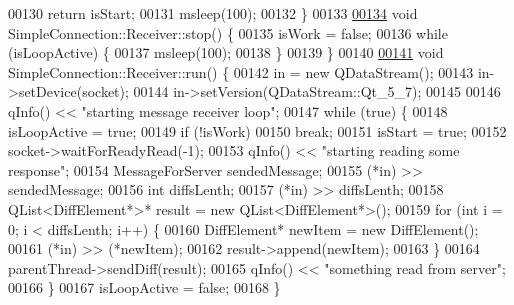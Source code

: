\begin{DoxyCode}
00130   \textcolor{keywordflow}{return} isStart;
00131   msleep(100);
00132 \}
00133 
\hyperlink{a00133_ab77d06e9677b12631ece8695a319e062}{00134} \textcolor{keywordtype}{void} SimpleConnection::Receiver::stop() \{
00135   isWork = \textcolor{keyword}{false};
00136   \textcolor{keywordflow}{while} (isLoopActive) \{
00137     msleep(100);
00138   \}
00139 \}
00140 
\hyperlink{a00133_a8bcc914a839e71786071f655ce5afe7e}{00141} \textcolor{keywordtype}{void} SimpleConnection::Receiver::run() \{
00142   in = \textcolor{keyword}{new} QDataStream();
00143   in->setDevice(socket);
00144   in->setVersion(QDataStream::Qt\_5\_7);
00145 
00146   qInfo() << \textcolor{stringliteral}{"starting message receiver loop"};
00147   \textcolor{keywordflow}{while} (\textcolor{keyword}{true}) \{
00148     isLoopActive = \textcolor{keyword}{true};
00149     \textcolor{keywordflow}{if} (!isWork)
00150       \textcolor{keywordflow}{break};
00151     isStart = \textcolor{keyword}{true};
00152     socket->waitForReadyRead(-1);
00153     qInfo() << \textcolor{stringliteral}{"starting reading some response"};
00154     MessageForServer sendedMessage;
00155     (*in) >> sendedMessage;
00156     \textcolor{keywordtype}{int} diffsLenth;
00157     (*in) >> diffsLenth;
00158     QList<DiffElement*>* result = \textcolor{keyword}{new} QList<DiffElement*>();
00159     \textcolor{keywordflow}{for} (\textcolor{keywordtype}{int} i = 0; i < diffsLenth; i++) \{
00160       DiffElement* newItem = \textcolor{keyword}{new} DiffElement();
00161       (*in) >> (*newItem);
00162       result->append(newItem);
00163     \}
00164     parentThread->sendDiff(result);
00165     qInfo() << \textcolor{stringliteral}{"something read from server"};
00166   \}
00167   isLoopActive = \textcolor{keyword}{false};
00168 \}
\end{DoxyCode}
